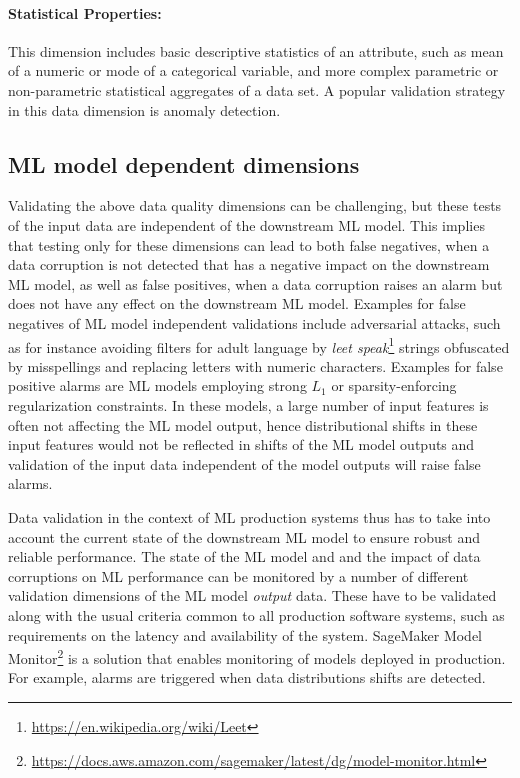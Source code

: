 \newpage
\paragraph{Statistical Properties:} This dimension includes basic descriptive statistics of an attribute, such as mean of a numeric or mode of a categorical variable, and more complex parametric or non-parametric statistical aggregates of a data set. A popular validation strategy in this data dimension is anomaly detection.

\subsection{ML model dependent dimensions}

Validating the above data quality dimensions can be challenging, but these tests of the input data are independent of the downstream ML model. This implies that testing only for these dimensions can lead to both false negatives, when a data corruption is not detected that has a negative impact on the downstream ML model, as well as false positives, when a data corruption raises an alarm but does not have any effect on the downstream ML model. Examples for false negatives of ML model independent validations include adversarial attacks, such as for instance avoiding filters for adult language by {\em leet speak}\footnote{\url{https://en.wikipedia.org/wiki/Leet}} strings obfuscated by misspellings and replacing letters with numeric characters. Examples for false positive alarms are ML models employing strong $L_1$ or sparsity-enforcing regularization constraints. In these models, a large number of input features is often not affecting the ML model output, hence distributional shifts in these input features would not be reflected in shifts of the ML model outputs and validation of the input data independent of the model outputs will raise false alarms.

Data validation in the context of ML production systems thus has to take into account the current state of the downstream ML model to ensure robust and reliable performance. The state of the ML model and and the impact of data corruptions on ML performance can be monitored by a number of different validation dimensions of the ML model {\em output} data. These have to be validated along with the usual criteria common to all production software systems, such as requirements on the latency and availability of the system. SageMaker Model Monitor\footnote{\url{https://docs.aws.amazon.com/sagemaker/latest/dg/model-monitor.html}} is a solution that enables monitoring of models deployed in production. For example, alarms are triggered when data distributions shifts are detected.

